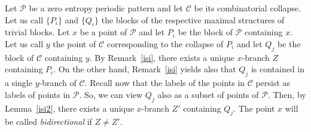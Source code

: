 \documentclass[a4paper]{amsart}
\theoremstyle{definition}
\begin{document}
Let $\mathcal{P}$ be a zero entropy periodic pattern and let $\mathcal{C}$ be its combinatorial collapse. Let us call $\{P_i\}$ and $\{Q_i\}$ the blocks of the respective maximal structures of trivial blocks. Let $x$ be a point of $\mathcal{P}$ and let $P_i$ be the block of $\mathcal{P}$ containing $x$. Let us call $y$ the point of $\mathcal{C}$ corresponding to the collapse of $P_i$ and let $Q_j$ be the block of $\mathcal{C}$ containing $y$. By Remark~\ref{isi}, there exists a unique $x$-branch $Z$ containing $P_i$. On the other hand, Remark~\ref{isi} yields also that $Q_j$ is contained in a single $y$-branch of $\mathcal{C}$. Recall now that the labels of the points in $\mathcal{C}$ persist as labels of points in $\mathcal{P}$. So, we can view $Q_j$ also as a subset of points of $\mathcal{P}$. Then, by Lemma~\ref{isi2}, there exists a unique $x$-branch $Z'$ containing $Q_j$. The point $x$ will be called \emph{bidirectional} if $Z\ne Z'$.
\end{document}
